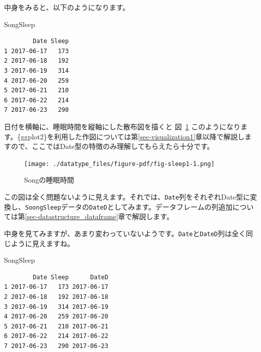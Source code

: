 \documentclass[
  a4paper,
  pandoc,
  ja=standard,
  jafont=haranoaji]{bxjsbook}
\newenvironment{Shaded}{\begin{snugshade}}{\end{snugshade}}
\newcommand{\FunctionTok}[1]{\textcolor[rgb]{0.28,0.35,0.67}{#1}}
\newcommand{\NormalTok}[1]{\textcolor[rgb]{0.00,0.48,0.65}{#1}}
\newcommand{\OtherTok}[1]{\textcolor[rgb]{0.00,0.48,0.65}{#1}}
\newcommand{\SpecialCharTok}[1]{\textcolor[rgb]{0.37,0.37,0.37}{#1}}
\begin{document}
中身をみると、以下のようになります。

\begin{Shaded}
\begin{Highlighting}[numbers=left,,]
\NormalTok{SongSleep}
\end{Highlighting}
\end{Shaded}

\begin{verbatim}
        Date Sleep
1 2017-06-17   173
2 2017-06-18   192
3 2017-06-19   314
4 2017-06-20   259
5 2017-06-21   210
6 2017-06-22   214
7 2017-06-23   290
\end{verbatim}

日付を横軸に、睡眠時間を縦軸にした散布図を描くと 図~\ref{fig-sleep1}
このようになります。\{ggplot2\}を利用した作図については第\ref{sec-visualization1}章以降で解説しますので、ここではDate型の特徴のみ理解してもらえたら十分です。

\begin{figure}

{\centering \texttt{[image: ./datatype\_files/figure-pdf/fig-sleep1-1.png]}

}

\caption{\label{fig-sleep1}Songの睡眠時間}

\end{figure}

この図は全く問題ないように見えます。それでは、\texttt{Date}列をそれぞれDate型に変換し、\texttt{SoongSleep}データの\texttt{DateD}としてみます。データフレームの列追加については第\ref{sec-datastructure_dataframe}章で解説します。

\begin{Shaded}
\end{Shaded}

中身を見てみますが、あまり変わっていないようです。\texttt{Date}と\texttt{DateD}列は全く同じように見えますね。

\begin{Shaded}
\begin{Highlighting}[numbers=left,,]
\NormalTok{SongSleep}
\end{Highlighting}
\end{Shaded}

\begin{verbatim}
        Date Sleep      DateD
1 2017-06-17   173 2017-06-17
2 2017-06-18   192 2017-06-18
3 2017-06-19   314 2017-06-19
4 2017-06-20   259 2017-06-20
5 2017-06-21   210 2017-06-21
6 2017-06-22   214 2017-06-22
7 2017-06-23   290 2017-06-23
\end{verbatim}
\end{document}
